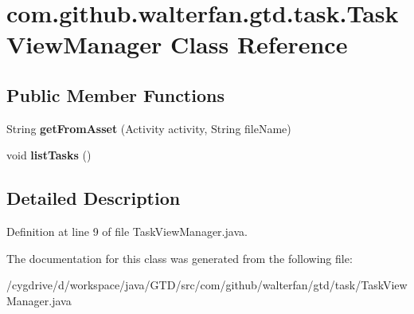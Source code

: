 \hypertarget{classcom_1_1github_1_1walterfan_1_1gtd_1_1task_1_1TaskViewManager}{\section{com.\-github.\-walterfan.\-gtd.\-task.\-Task\-View\-Manager Class Reference}
\label{classcom_1_1github_1_1walterfan_1_1gtd_1_1task_1_1TaskViewManager}
}
\subsection*{Public Member Functions}
\begin{DoxyCompactItemize}
\item 
\hypertarget{classcom_1_1github_1_1walterfan_1_1gtd_1_1task_1_1TaskViewManager_a817ebc057b16d9aad7772ad6081bc303}{String {\bfseries get\-From\-Asset} (Activity activity, String file\-Name)}\label{classcom_1_1github_1_1walterfan_1_1gtd_1_1task_1_1TaskViewManager_a817ebc057b16d9aad7772ad6081bc303}

\item 
\hypertarget{classcom_1_1github_1_1walterfan_1_1gtd_1_1task_1_1TaskViewManager_adb4e7a3473a2ca7d5f160570acc96617}{void {\bfseries list\-Tasks} ()}\label{classcom_1_1github_1_1walterfan_1_1gtd_1_1task_1_1TaskViewManager_adb4e7a3473a2ca7d5f160570acc96617}

\end{DoxyCompactItemize}


\subsection{Detailed Description}


Definition at line 9 of file Task\-View\-Manager.\-java.



The documentation for this class was generated from the following file\-:\begin{DoxyCompactItemize}
\item 
/cygdrive/d/workspace/java/\-G\-T\-D/src/com/github/walterfan/gtd/task/Task\-View\-Manager.\-java\end{DoxyCompactItemize}
